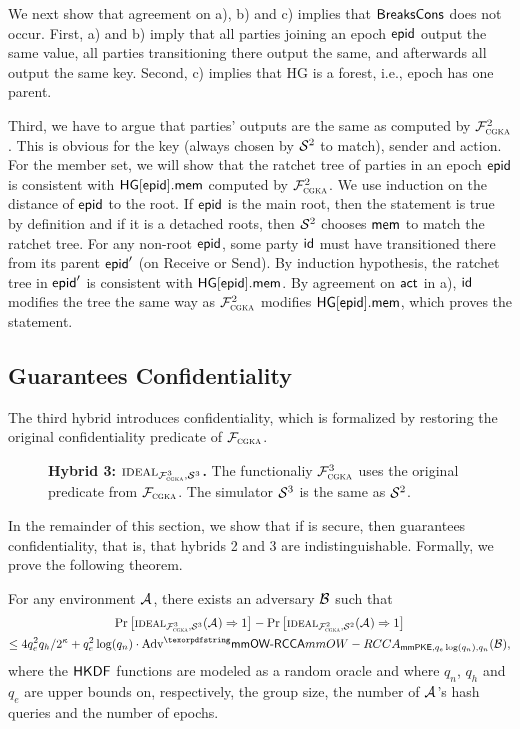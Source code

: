 We next show that agreement on a), b) and c) implies that $\textnormal{\textsf{BreaksCons}}$ does not occur. First, a) and b) imply that all parties joining an epoch ${\normalfont\textsf{epid}}$ output the same value, all parties transitioning there output the same, and afterwards all output the same key. Second, c) implies that HG is a forest, i.e., epoch has one parent.

Third, we have to argue that parties' outputs are the same as computed by $\mathcal{F}_{\normalfont\textsc{cgka}}^2$. This is obvious for the key (always chosen by $\mathcal{S}_{\textsc{\relax}}^2$ to match), sender and action. For the member set, we will show that the ratchet tree of parties in an epoch ${\normalfont\textsf{epid}}$ is consistent with ${\mathsf{HG}}[{\normalfont\textsf{epid}}].\mathsf{mem}$ computed by $\mathcal{F}_{\normalfont\textsc{cgka}}^2$. We use induction on the distance of ${\normalfont\textsf{epid}}$ to the root. If ${\normalfont\textsf{epid}}$ is the main root, then the statement is true by definition and if it is a  detached roots, then $\mathcal{S}_{\textsc{\relax}}^2$ chooses $\mathsf{mem}$ to match the ratchet tree. For any non-root ${\normalfont\textsf{epid}}$, some party ${\mathsf{id}}$ must have transitioned there from its parent ${\normalfont\textsf{epid}}'$ (on Receive or Send). By induction hypothesis, the ratchet tree in ${\normalfont\textsf{epid}}'$ is consistent with ${\mathsf{HG}}[{\normalfont\textsf{epid}}].\mathsf{mem}$. By agreement on $\mathsf{act}$ in a), ${\mathsf{id}}$ modifies the tree the same way as $\mathcal{F}_{\normalfont\textsc{cgka}}^2$ modifies ${\mathsf{HG}}[{\normalfont\textsf{epid}}].\mathsf{mem}$, which proves the statement.

\subsection{\saik Guarantees Confidentiality}\label{sec:protsec4}
The third hybrid introduces confidentiality, which is formalized by restoring the original confidentiality predicate of $\mathcal{F}_{\normalfont\textsc{cgka}}$.
\begin{description}
\item[] {\bf Hybrid 3: $\textnormal{\textsc{ideal}}_{\mathcal{F}_{\normalfont\textsc{cgka}}^3, \mathcal{S}_{\textsc{\relax}}^3}$.} The functionaliy $\mathcal{F}_{\normalfont\textsc{cgka}}^3$ uses the original \KwConf{} predicate from $\mathcal{F}_{\normalfont\textsc{cgka}}$. The simulator $\mathcal{S}_{\textsc{\relax}}^3$ is the same as $\mathcal{S}_{\textsc{\relax}}^2$.
\end{description}

In the remainder of this section, we show that if \mmPKE is \mmowrcca secure, then \saik guarantees confidentiality, that is, that hybrids 2 and 3 are indistinguishable. Formally, we prove the following theorem.
\begin{theorem}

  For any environment $\mathcal{A}_{\relax}$, there exists an adversary $\mathcal{B}_{\relax}$ such that
  \normalfont
  \begin{multline*}
    \Pr\left[\ucideal_{\funcCGKA^3, \ucsim^3}(\Adv) \Rightarrow 1\right] - \Pr\left[\ucideal_{\funcCGKA^2,
        \ucsim^2}(\Adv) \Rightarrow 1\right]\\
    \leq 4q_e^2q_h/2^\kappa + q_e^2\log(q_n)\cdot\textnormal{Adv}^\mmowrcca_{\mmPKE,q_e\log(q_n),q_n}(\Bdv),
  \end{multline*}
  where the ${\mathsf{HKDF}}$ functions are modeled as a random oracle and where $q_n$, $q_h$ and $q_e$ are upper bounds on, respectively, the group size, the number of $\mathcal{A}_{\relax}$'s hash queries and the number of epochs.
\label{thm:hybrid2}\end{theorem}

